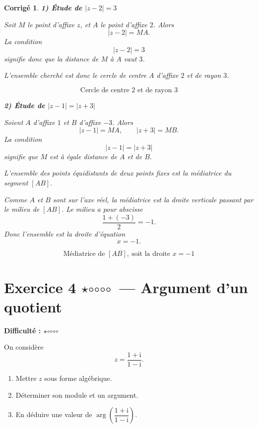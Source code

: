 \documentclass[11pt,a4paper]{article}
\newtheorem*{corrige}{Corrigé}
\newcommand{\ii}{\mathrm{i}}
\newcommand{\fullstar}{\(\star\)}
\newcommand{\emptystar}{\(\circ\)}
\newcommand{\oneStar}{\fullstar\emptystar\emptystar\emptystar\emptystar}
\newcommand{\difficulty}[1]{\textbf{Difficulté : #1}}
\begin{document}
\begin{corrige}
\textbf{1) Étude de \(|z-2|=3\)}

Soit \(M\) le point d'affixe \(z\), et \(A\) le point d'affixe \(2\). Alors
\[
|z-2|=MA.
\]
La condition
\[
|z-2|=3
\]
signifie donc que la distance de \(M\) à \(A\) vaut \(3\).

L'ensemble cherché est donc le cercle de centre \(A\) d'affixe \(2\) et de rayon \(3\).

\[
\boxed{\text{Cercle de centre }2\text{ et de rayon }3}
\]

\textbf{2) Étude de \(|z-1|=|z+3|\)}

Soient \(A\) d'affixe \(1\) et \(B\) d'affixe \(-3\). Alors
\[
|z-1|=MA,\qquad |z+3|=MB.
\]
La condition
\[
|z-1|=|z+3|
\]
signifie que \(M\) est à égale distance de \(A\) et de \(B\).

L'ensemble des points équidistants de deux points fixes est la médiatrice du segment \([AB]\).

Comme \(A\) et \(B\) sont sur l'axe réel, la médiatrice est la droite verticale passant par le milieu de \([AB]\). Le milieu a pour abscisse
\[
\frac{1+(-3)}{2}=-1.
\]
Donc l'ensemble est la droite d'équation
\[
x=-1.
\]

\[
\boxed{\text{Médiatrice de }[AB],\ \text{soit la droite }x=-1}
\]
\end{corrige}

\section{Exercice 4 \oneStar\ --- Argument d'un quotient}
\difficulty{\oneStar}

On considère
\[
z=\frac{1+\ii}{1-\ii}.
\]

\begin{enumerate}
    \item Mettre \(z\) sous forme algébrique.
    \item Déterminer son module et un argument.
    \item En déduire une valeur de \(\arg\left(\dfrac{1+\ii}{1-\ii}\right)\).
\end{enumerate}
\end{document}
